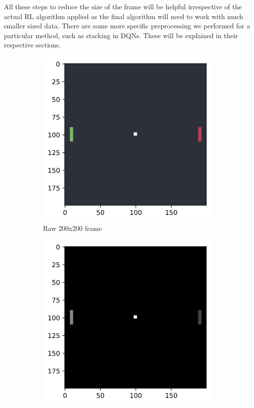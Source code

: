 \medskip
\noindent
All these steps to reduce the size of the frame will be helpful irrespective of the actual RL algorithm applied as the final algorithm will need to work with much smaller sized data. There are some more specific preprocessing we performed for a particular method, such as stacking in DQNs. These will be explained in their respective sections.
\begin{figure}[h!]
    \centering
    \begin{subfigure}{.49\textwidth}
        \centering
        \includegraphics[width=\textwidth]{figures/raw.png}
        \caption{Raw 200x200 frame}
        \label{fig-raw}
    \end{subfigure}
    \begin{subfigure}{0.49\textwidth}
        \centering
        \includegraphics[width=\textwidth]{figures/bw.png}

\end{subfigure}
\end{figure}
